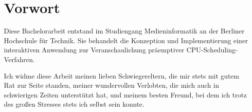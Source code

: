 \chapter*{Vorwort}

Diese Bachelorarbeit entstand im Studiengang Medieninformatik an der Berliner Hochschule für Technik. Sie behandelt die Konzeption und Implementierung einer interaktiven Anwendung zur Veranschaulichung präemptiver CPU-Scheduling-Verfahren.

Ich widme diese Arbeit meinen lieben Schwiegereltern, die mir stets mit gutem Rat zur Seite standen, meiner wundervollen Verlobten, die mich auch in schwierigen Zeiten unterstützt hat, und meinem besten Freund, bei dem ich trotz des großen Stresses stets ich selbst sein konnte.